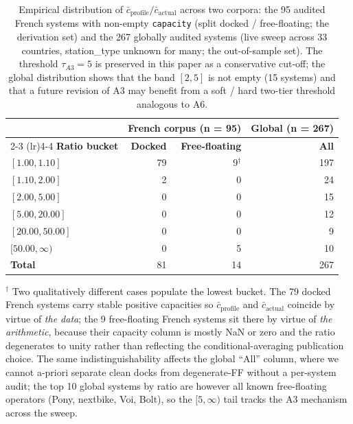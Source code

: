 \documentclass[11pt,a4paper]{article}
\begin{document}
\begin{table}[ht]
\centering
\caption{Empirical distribution of
$\bar c_{\text{profile}}/\bar c_{\text{actual}}$ across two
corpora: the 95 audited French systems with non-empty
\texttt{capacity} (split docked / free-floating; the derivation
set) and the 267 globally audited systems (live sweep across 33
countries, station\_type unknown for many; the out-of-sample
set). The threshold $\tau_{A3} = 5$ is preserved in this paper
as a conservative cut-off; the global distribution shows that
the band $[2, 5]$ is not empty (15 systems) and that a future
revision of A3 may benefit from a soft / hard two-tier
threshold analogous to A6.}
\label{tab:a3-threshold-empirical}
\small
\begin{tabular}{@{}lrrr@{}}
\toprule
& \multicolumn{2}{c}{\textbf{French corpus (n = 95)}} & \textbf{Global (n = 267)}\\
\cmidrule(lr){2-3} \cmidrule(lr){4-4}
\textbf{Ratio bucket} & \textbf{Docked} & \textbf{Free-floating} & \textbf{All}\\
\midrule
$[1.00, 1.10]$    & 79 & 9$^\dag$ & 197 \\
$[1.10, 2.00]$    & 2  & 0        & 24 \\
$[2.00, 5.00]$    & 0  & 0        & 15 \\
$[5.00, 20.00]$   & 0  & 0        & 12 \\
$[20.00, 50.00]$  & 0  & 0        & 9 \\
$[50.00, \infty)$ & 0  & 5        & 10 \\
\midrule
\textbf{Total}    & 81 & 14       & 267 \\
\bottomrule
\end{tabular}

\medskip
{\footnotesize $^\dag$ Two qualitatively different cases populate
the lowest bucket. The 79 docked French systems carry stable
positive capacities so $\bar c_{\text{profile}}$ and
$\bar c_{\text{actual}}$ coincide by virtue of \emph{the data};
the 9 free-floating French systems sit there by virtue of
\emph{the arithmetic}, because their capacity column is mostly
NaN or zero and the ratio degenerates to unity rather than
reflecting the conditional-averaging publication choice. The
same indistinguishability affects the global ``All'' column,
where we cannot a-priori separate clean docks from degenerate-FF
without a per-system audit; the top 10 global systems by ratio
are however all known free-floating operators (Pony, nextbike,
Voi, Bolt), so the $[5, \infty)$ tail tracks the A3 mechanism
across the sweep.}
\end{table}
\end{document}
